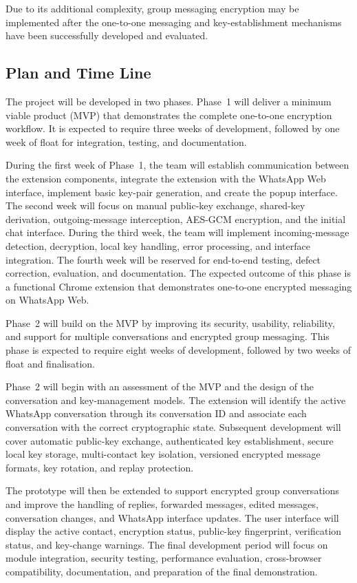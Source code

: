 \documentclass[11pt]{article}
\begin{document}
 Due to its additional complexity, group messaging encryption may be implemented after the one-to-one messaging and key-establishment mechanisms have been successfully developed and evaluated.



 \subsection{Plan and Time Line}
 The project will be developed in two phases. Phase~1 will deliver a minimum viable product (MVP) that demonstrates the complete one-to-one encryption workflow. It is expected to require three weeks of development, followed by one week of float for integration, testing, and documentation.

 During the first week of Phase~1, the team will establish communication between the extension components, integrate the extension with the WhatsApp Web interface, implement basic key-pair generation, and create the popup interface. The second week will focus on manual public-key exchange, shared-key derivation, outgoing-message interception, AES-GCM encryption, and the initial chat interface. During the third week, the team will implement incoming-message detection, decryption, local key handling, error processing, and interface integration. The fourth week will be reserved for end-to-end testing, defect correction, evaluation, and documentation. The expected
 outcome of this phase is a functional Chrome extension that demonstrates one-to-one encrypted messaging on WhatsApp Web.

 Phase~2 will build on the MVP by improving its security, usability, reliability, and support for multiple conversations and encrypted group messaging. This phase is expected to require eight weeks of development, followed by two weeks of float and finalisation.

 Phase~2 will begin with an assessment of the MVP and the design of the conversation and key-management models. The extension will identify the active WhatsApp conversation through its conversation ID and associate each conversation with the correct cryptographic state. Subsequent development will cover automatic public-key exchange, authenticated key establishment, secure local key storage, multi-contact key isolation, versioned encrypted message formats, key rotation, and replay protection.

 The prototype will then be extended to support encrypted group conversations and improve the handling of replies, forwarded messages, edited messages, conversation changes, and WhatsApp interface updates. The user interface will display the active contact, encryption status, public-key fingerprint, verification status, and key-change warnings. The final development period
 will focus on module integration, security testing, performance evaluation, cross-browser compatibility, documentation, and preparation of the final demonstration.
\end{document}
